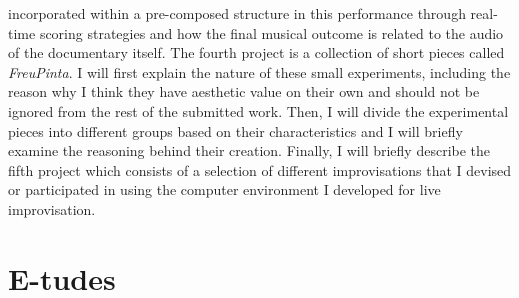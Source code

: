incorporated within a pre-composed structure in this performance through real-time scoring strategies and how the final musical outcome is related to the audio of the documentary itself. The fourth project is a collection of short pieces called \emph{FreuPinta}. I will first explain the nature of these small experiments, including the reason why I think they have aesthetic value on their own and should not be ignored from the rest of the submitted work. Then, I will divide the experimental pieces into different groups based on their characteristics and I will briefly examine the reasoning behind their creation. Finally, I will briefly describe the fifth project which consists of a selection of different improvisations that I devised or participated in using the computer environment I developed for live improvisation.

\section{E-tudes}


